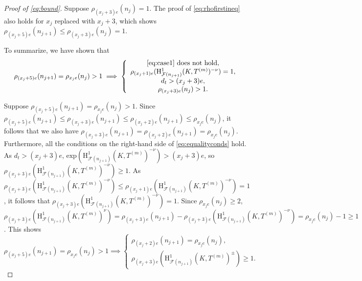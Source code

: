\documentclass[a4paper,10pt]{amsart}
\numberwithin{equation}{section}
\numberwithin{equation}{section}
\theoremstyle{plain}
\theoremstyle{definition}
\theoremstyle{definition}
\theoremstyle{plain}
\theoremstyle{plain}
\theoremstyle{plain}
\theoremstyle{plain}
\newcommand{\F}{\mathcal{F}}
\newcommand{\Fcal}{\mathcal{F}}
\newcommand{\fm}{\mathfrak{m}}
\newcommand{\rH}{\mathrm{H}}
\begin{document}
\begin{proof}[Proof of \eqref{eq:bound}]
Suppose $\rho_{(x_j+3)e}(n_j)=1$. The proof of \eqref{eq:rhofirstineq} also holds for $x_j$ replaced with $x_j+3$, which shows
$\rho_{(x_j+5)e}(n_{j+1}) \leq \rho_{(x_{j}+3)e}(n_{j})=1$.

To summarize, we have shown that 
\begin{equation}\label{eq:equalityconds}
\rho_{(x_j+5)e}(n_{j+1}) = \rho_{x_je}(n_j)>1 \implies
\left\{
\begin{array}{c} \text{\eqref{eq:case1} does not hold}, \\ \rho_{(x_j+1)e}(\rH^1_{\F(n_{j+1})}(K,T^{(m)})^{-\nu})=1, \\  
d_t > (x_j+3)e, \\ \rho_{(x_j+3)e}(n_j)>1.
\end{array} 
\right.
\end{equation}

Suppose $\rho_{(x_j+5)e}(n_{j+1}) = \rho_{x_je}(n_j)>1$.  Since $\rho_{(x_j+5)e}(n_{j+1}) \leq \rho_{(x_j+3)e}(n_{j+1}) \leq \rho_{(x_j+2)e}(n_{j+1}) \leq \rho_{x_je}(n_j)$,
it follows that we also have $\rho_{(x_j+3)e}(n_{j+1})=\rho_{(x_j+2)e}(n_{j+1}) = \rho_{x_je}(n_j)$. 
Furthermore, all the conditions on the right-hand side of
\eqref{eq:equalityconds} hold. As $d_t> (x_j+3)e$, $\mathrm{exp}(\rH^1_{\F(n_{j+1})}(K,T^{(m)})^{-\nu} )> (x_j+3)e$,
so $\rho_{(x_j+3)e}(\rH^1_{\F(n_{j+1})}(K,T^{(m)})^{-\nu} )\geq 1$. 
As $\rho_{(x_j+3)e}(\rH^1_{\F(n_{j+1})}(K,T^{(m)})^{-\nu}) \leq \rho_{(x_j+1)e}(\rH^1_{\F(n_{j+1})}(K,T^{(m)})^{-\nu})=1$, it follows
that $\rho_{(x_j+3)e}(\rH^1_{\F(n_{j+1})}(K,T^{(m)})^{-\nu}) =1$. 
Since $\rho_{x_je}(n_j) \geq 2$,
$\rho_{(x_j+3)e}(\rH^1_{\F(n_{j+1})}(K,T^{(m)})^{\nu}) =  \rho_{(x_j+3)e}(n_{j+1})  - \rho_{(x_j+3)e}(\rH^1_{\F(n_{j+1})}(K,T^{(m)})^{-\nu})  
= \rho_{x_je}(n_j) -1 \geq 1$. This shows
\begin{equation}\label{eq:equalityconds2}
\rho_{(x_j+5)e}(n_{j+1}) = \rho_{x_je}(n_j)>1 \implies
\left\{
\begin{array}{c} \rho_{(x_j+2)e}(n_{j+1}) = \rho_{x_je}(n_j), \\ \rho_{(x_j+3)e}(\rH^1_{\F(n_{j+1})}(K,T^{(m)})^{\pm})\geq 1.
\end{array}\right.
\end{equation}









\end{proof}
\end{document}
